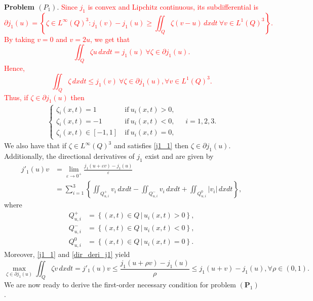 \documentclass[reqno]{amsart}
\begin{document}
	\textbf{Problem $(P_1)$}. \textcolor{red}{Since $j_1$ is convex and Lipchitz continuous, its subdifferential is \[\partial j_1(u)=\left\{ \zeta \in L^\infty(Q)^3: j_1(v)-j_1(u) \geq \iint_Q \zeta (v-u) \, dxdt \ \forall v\in L^1(Q)^3 \right \}.\]
		By taking $v=0$ and $v=2u$, we get that
		\[\iint_Q \zeta u \, dxdt = j_1(u) \ \forall \zeta \in \partial j_1(u).\]
		Hence,
		\[\iint_Q \zeta \, dxdt \leq j_1(v) \ \forall \zeta \in \partial j_1(u), \forall v\in L^1(Q)^3.\]
		Thus, if $\zeta \in \partial j_1(u)$ then }
	\begin{align} \label{j1_1}
		\begin{cases}
			\zeta_i(x,t)=1 &\ \text{if} \ u_i(x,t)>0,\\
			\zeta_i(x,t)=-1 &\ \text{if} \ u_i(x,t) <0,\\
			\zeta_i(x,t) \in [-1,1] &\ \text{if} \ u_i(x,t)=0,
		\end{cases}
		\hspace{13pt} i=1,2,3.
	\end{align}
	We also have that if $\zeta \in L^\infty(Q)^3$ and satisfies \eqref{j1_1} then $\zeta\in \partial j_1(u)$.\\
	Additionally, the directional derivatives of $j_1$ exist and are given by
	\begin{equation} \label{dir_deri_j1}
		\begin{aligned}
			j'_1(u)v&=\underset{\varepsilon\rightarrow0^+}{\lim} \frac{j_1(u+\varepsilon v)-j_1(u)}{\varepsilon} \\
			&=\sum_{i=1}^3 \left\{ \iint_{Q_{u,i}^+} v_i \, dxdt - \iint_{Q_{u,i}^-} v_i \, dxdt + \iint_{Q_{u,i}^0} \vert v_i \vert \, dxdt \right\},
		\end{aligned}
	\end{equation}
	where
	\begin{align*}
		Q_{u,i}^+ &= \left\{ (x,t)\in Q  \,| \, u_i(x,t)>0 \right\},\\
		Q_{u,i}^- &= \left\{ (x,t)\in Q \,| \, u_i(x,t)<0 \right\},\\
		Q_{u,i}^0 &= \left\{ (x,t)\in Q \,| \, u_i(x,t)=0 \right\}.
	\end{align*}
	Moreover, \eqref{j1_1} and \eqref{dir_deri_j1} yield
	\begin{equation*}
		\underset{\zeta  \in \partial j_1(u)}{\max} \iint_Q \zeta v\, dxdt = j'_1(u)v \leq \frac{j_1(u+\rho v)-j_1(u)}{\rho} \leq j_1(u+v)-j_1(u), \forall \rho \in (0,1).
	\end{equation*}
	We are now ready to derive the first-order necessary condition for problem $(\textbf{P}_1)$.
	
\end{document}
